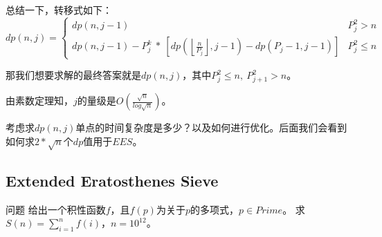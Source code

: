 总结一下，转移式如下：
$$
dp(n,j)=
\begin{cases}
dp(n,j-1)&P_j^2 > n\\
dp(n,j-1)-P_{j}^k\ *\ [dp(\left\lfloor \frac{n}{P_j} \right\rfloor,j-1)-dp(P_j-1,j-1)]&P_j^2\le n
\end{cases}
$$

{\heiti 那我们想要求解的最终答案就是$dp(n,j)$，其中$P_j^2\le n,\ P_{j+1}^2> n$。}

由素数定理知，$j$的量级是$O(\frac{\sqrt{n}}{log\sqrt{n}})$。

\begin{note}
考虑求$dp(n,j)$单点的时间复杂度是多少？以及如何进行优化。后面我们会看到如何求$2*\sqrt{n}$个$dp$值用于$EES$。
\end{note}

\subsection{Extended Eratosthenes Sieve}
\begin{custom}{问题}
给出一个积性函数$f$，且$f(p)$为关于$p$的多项式，$p\in Prime$。
求$S(n)=\sum_{i=1}^nf(i)$，$n=10^{12}$。
\end{custom}


